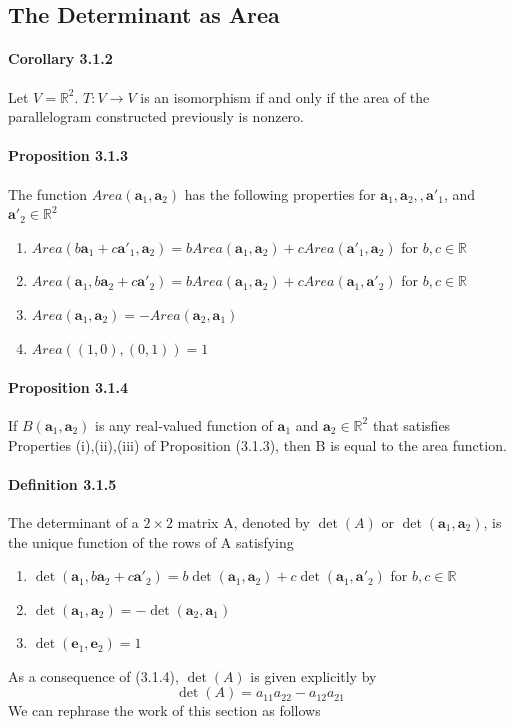 \documentclass[11pt]{article}
\newcommand{\tb}[1]{\textbf{#1}}
\newcommand{\real}[0]{\mathbb{R}}
\newcommand{\va}[0]{\tb{a}}
\begin{document}
{\subsection{The Determinant as Area}
\paragraph{Corollary 3.1.2} Let $V = \real^2$. $T: V \rightarrow V$ is an isomorphism if and only if the area of the parallelogram constructed previously is nonzero.
\paragraph{Proposition 3.1.3} The function $Area(\tb{a}_1,\tb{a}_2)$ has the following properties for $\tb{a}_1, \tb{a}_2,, \tb{a}'_1$, and $\tb{a}'_2 \in \real^2$
\begin{enumerate}
	\item $Area(b\va_1 + c\va'_1, \va_2) = b Area(\va_1, \va_2) + c Area(\va'_1, \va_2)$ for $b, c\in \real$
	\item $Area(\va_1, b\va_2 + c\va'_2) = b Area(\va_1, \va_2) + c Area(\va_1, \va'_2)$ for $b, c\in \real$
	\item $Area(\va_1, \va_2) = -Area(\va_2, \va_1)$
	\item $Area((1,0),(0,1)) = 1$
\end{enumerate}
\paragraph{Proposition 3.1.4} If $B(\va_1,\va_2)$ is any real-valued function of $\va_1$ and $\va_2 \in \real^2$ that satisfies Properties (i),(ii),(iii) of Proposition (3.1.3), then B is equal to the area function.
\paragraph{Definition 3.1.5}
The determinant of a $2 \times 2$ matrix A, denoted by $\det(A)$ or $\det(\va_1,\va_2)$, is the unique function of the rows of A satisfying
\begin{enumerate}
	\item $\det(\va_1, b\va_2 + c\va'_2) = b \det(\va_1, \va_2) + c \det(\va_1, \va'_2)$ for $b, c\in \real$
	\item $\det(\va_1, \va_2) = -\det(\va_2, \va_1)$
	\item $\det(\tb{e}_1, \tb{e}_2) = 1$
\end{enumerate}
As a consequence of (3.1.4), $\det(A)$ is given explicitly by\\
$$\det(A) = a_{11}a_{22} - a_{12}a_{21}$$
We can rephrase the work of this section as follows
}
\end{document}
